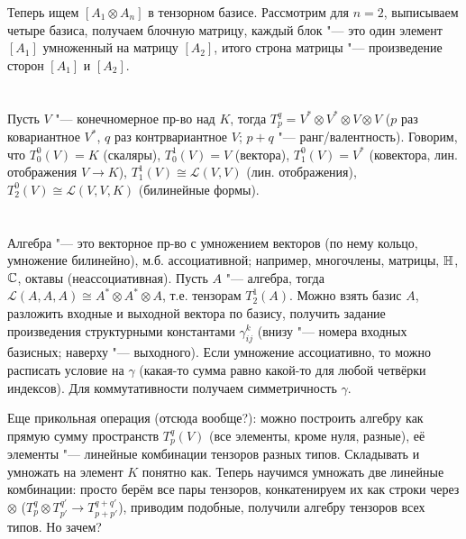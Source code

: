 Теперь ищем $[A_1 \otimes A_n]$ в тензорном базисе.
Рассмотрим для $n=2$, выписываем четыре базиса, получаем блочную матрицу, каждый блок "--- это один элемент $[A_1]$ умноженный
на матрицу $[A_2]$, итого строна матрицы "--- произведение сторон $[A_1]$ и $[A_2]$.

\section{} %
Пусть $V$ "--- конечномерное пр-во над $K$, тогда $T_p^q = V^*\otimes V^*\otimes V \otimes V$ ($p$ раз ковариантное $V^*$, $q$ раз контрвариантное $V$; $p+q$ "--- ранг/валентность).
Говорим, что $T_0^0(V)=K$ (скаляры), $T_0^1(V)=V$ (вектора), $T_1^0(V)=V^*$ (ковектора, лин. отображения $V \to K$), $T_1^1(V) \cong \mathcal L (V, V)$ (лин. отображения),
$T_2^0(V) \cong \mathcal L(V, V, K)$ (билинейные формы).

\section{} %

Алгебра "--- это векторное пр-во с умножением векторов (по нему кольцо, умножение билинейно), м.б. ассоциативной;
например, многочлены, матрицы, $\mathbb{H}$, $\mathbb{C}$, октавы (неассоциативная).
Пусть $A$ "--- алгебра, тогда $\mathcal L(A, A, A) \cong A^* \otimes A^* \otimes A$, т.е. тензорам $T_2^1(A)$.
Можно взять базис $A$, разложить входные и выходной вектора по базису, получить задание произведения структурными
константами $\gamma_{ij}^k$ (внизу "--- номера входных базисных; наверху "--- выходного).
Если умножение ассоциативно, то можно расписать условие на $\gamma$ (какая-то сумма равно какой-то для любой четвёрки индексов).
Для коммутативности получаем симметричность $\gamma$.

Еще прикольная операция (отсюда вообще?): можно построить алгебру как прямую сумму пространств $T_p^q(V)$ (все элементы, кроме нуля, разные),
её элементы "--- линейные комбинации тензоров разных типов.
Складывать и умножать на элемент $K$ понятно как.
Теперь научимся умножать две линейные комбинации: просто берём все пары тензоров, конкатенируем их как строки через $\otimes$ ($T_p^q \otimes T_{p'}^{q'} \to T_{p+p'}^{q+q'}$),
приводим подобные, получили алгебру тензоров всех типов.
Но зачем?

\section{} %
\TODO

\section{} %
\TODO

